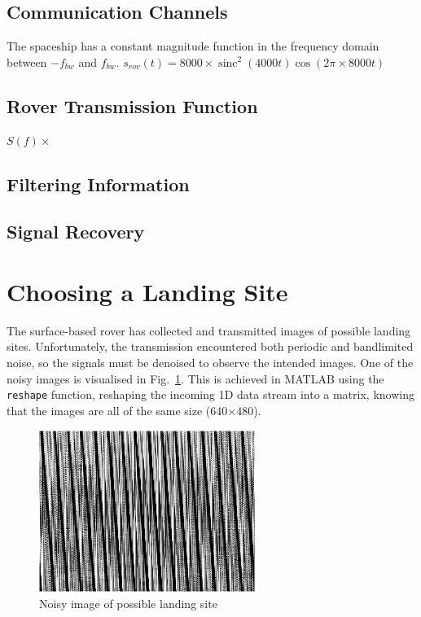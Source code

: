 \documentclass[12pt]{article}
\DeclareMathOperator{\sinc}{sinc}
\numberwithin{equation}{section}
\numberwithin{figure}{section}
\numberwithin{table}{section}
\begin{document}
\subsection{Communication Channels}
The spaceship has a constant magnitude function in the frequency domain between
$-f_{bw}$ and $f_{bw}$.
\begin{math}
    s_{rov}(t) = 8000 \times \sinc^2(4000t)\cos(2\pi \times 8000t)
\end{math}
\subsection{Rover Transmission Function}
\begin{math}
    S(f) \times
\end{math}
\subsection{Filtering Information}
\subsection{Signal Recovery}
\pagebreak

%
%
\section{Choosing a Landing Site}

The surface-based rover has collected and transmitted images of possible
landing sites. Unfortunately, the transmission encountered both periodic and
bandlimited noise, so the signals must be denoised to observe the intended
images. One of the noisy images is visualised in Fig.~\ref{fig:p2-noisy}. This
is achieved in MATLAB using the \verb+reshape+ function, reshaping the incoming
1D data stream into a matrix, knowing that the images are all of the same size
(640$\times$480).

\begin{figure}[ht]
    \centering
    \includegraphics[width=7cm]{figures/p2-noisy.png}
    \caption{Noisy image of possible landing site\label{fig:p2-noisy}}
\end{figure}
\end{document}
